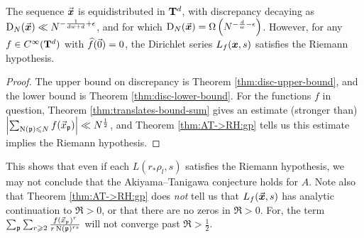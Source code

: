 \begin{theorem}
The sequence $\vec{\boldsymbol x}$ is equidistributed in $\mathbf{T}^d$, with discrepancy 
decaying as $\operatorname{D}_N(\vec{\boldsymbol x}) \ll N^{-\frac{1}{d w+d} + \epsilon}$, and for which 
$\operatorname{D}_N(\vec{\boldsymbol x}) = \Omega\left(N^{-\frac{d}{w} - \epsilon}\right)$. 
However, for any $f\in C^\infty(\mathbf{T}^d)$ with $\widehat f(\vec{0})=0$, the 
Dirichlet series  $L_f({\boldsymbol x},s)$ satisfies the Riemann hypothesis. 
\end{theorem}
\begin{proof}
The upper bound on discrepancy is Theorem \ref{thm:disc-upper-bound}, and 
the lower bound is Theorem \ref{thm:disc-lower-bound}. For the functions $f$ in 
question, Theorem \ref{thm:translates-bound-sum} gives an estimate (stronger 
than) $\left| \sum_{\operatorname{N}(\mathfrak{p})\leqslant N} f(\vec{x}_{\mathfrak{p}})\right|\ll N^{\frac 1 2}$, and 
Theorem \ref{thm:AT->RH:gp} tells us this estimate implies the Riemann 
hypothesis. 
\end{proof}

This shows that even if each $L(r_\ast \rho_l,s)$ satisfies the Riemann 
hypothesis, we may not conclude that the Akiyama--Tanigawa 
conjecture holds for $A$. Note also that Theorem \ref{thm:AT->RH:gp} does 
\emph{not} tell us that $L_f(\vec{\boldsymbol x},s)$ has analytic continuation to $\Re > 0$, or 
that there are no zeros in $\Re > 0$. For, the term 
$\sum_{\mathfrak{p}} \sum_{r\geqslant 2} \frac{f(\vec{x}_{\mathfrak{p}})^r}{r \operatorname{N}(\mathfrak{p})^{r s}}$ will not 
converge past $\Re > \frac 1 2$.
